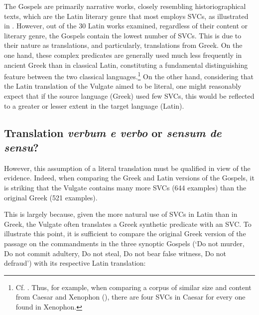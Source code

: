 \documentclass[output=paper,colorlinks,citecolor=brown]{langscibook}
\begin{document}
The Gospels are primarily narrative works, closely resembling historiographical texts,
which are the Latin literary genre that most employs SVCs, as illustrated in .
However, out of the 30 Latin works examined, regardless of their content or literary
genre, the Gospels contain the lowest number of SVCs. This is due to their nature as
translations, and particularly, translations from Greek. On the one hand, these complex
predicates are generally used much less frequently in ancient Greek than in classical
Latin, constituting a fundamental distinguishing feature between the two classical
languages.\largerpage\footnote{Cf. \citet{BañosJoséMiguel-2015206}. Thus, for example, when comparing
  a corpus of similar size and content from Caesar and Xenophon (\cite{LópezMartín2019}),
  there are four SVCs in Caesar for every one found in Xenophon.} On the other hand,
considering that the Latin translation of the Vulgate aimed to be literal, one might
reasonably expect that if the source language (Greek) used few SVCs, this would be
reflected to a greater or lesser extent in the target language (Latin).


\subsection{Translation \emph{verbum e verbo} or \emph{sensum de sensu}?}\label{sec:bj:4:1}

However, this assumption of a literal translation must be qualified in view of the
evidence. Indeed, when comparing the Greek and Latin versions of the Gospels, it is
striking that the Vulgate contains many more SVCs (644 examples) than the original Greek
(521 examples).

This is largely because, given the more natural use of SVCs in Latin than in Greek, the
Vulgate often translates a Greek synthetic predicate with an SVC. To illustrate this
point, it is sufficient to compare the original Greek version of the passage on the
commandments in the three synoptic Gospels (`Do not murder, Do not commit adultery, Do not
steal, Do not bear false witness, Do not defraud') with its respective Latin translation:


\ea\label{ex:bj:13}

\ea\label{ex:bj:13a}
\end{document}
